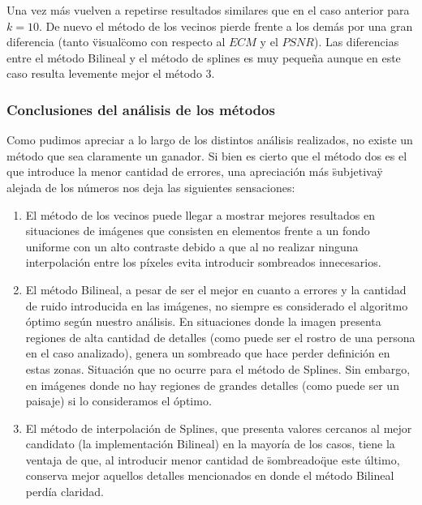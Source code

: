 Una vez más vuelven a repetirse resultados similares que en el caso anterior para $k=10$. De nuevo el método de los vecinos pierde frente a los demás por una gran diferencia (tanto \"visual\" como con respecto al $ECM$ y el $PSNR$). Las diferencias entre el método Bilineal y el método de splines es muy pequeña aunque en este caso resulta levemente mejor el método 3.


\subsubsection{Conclusiones del análisis de los métodos}
Como pudimos apreciar a lo largo de los distintos análisis realizados, no existe un método que sea claramente un ganador.
Si bien es cierto que el método dos es el que introduce la menor cantidad de errores, una apreciación más \"subjetiva\" y alejada de los números nos deja las siguientes sensaciones:
\begin{enumerate}
 \item El método de los vecinos puede llegar a mostrar mejores resultados en situaciones de imágenes que consisten en elementos frente a un fondo uniforme con un alto contraste debido a que al no realizar ninguna interpolación entre los píxeles evita introducir sombreados innecesarios.
 \item El método Bilineal, a pesar de ser el mejor en cuanto a errores y la cantidad de ruido introducida en las imágenes, no siempre es considerado el algoritmo óptimo según nuestro análisis. En situaciones donde la imagen presenta regiones de alta cantidad de detalles (como puede ser el rostro de una persona en el caso analizado), genera un sombreado que hace perder definición en estas zonas. Situación que no ocurre para el método de Splines. Sin embargo, en imágenes donde no hay regiones de grandes detalles (como puede ser un paisaje) si lo consideramos el óptimo.
 \item El método de interpolación de Splines, que presenta valores cercanos al mejor candidato (la implementación Bilineal) en la mayoría de los casos, tiene la ventaja de que, al introducir menor cantidad de \"sombreado\" que este último, conserva mejor aquellos detalles mencionados en donde el método Bilineal perdía claridad.
\end{enumerate}




